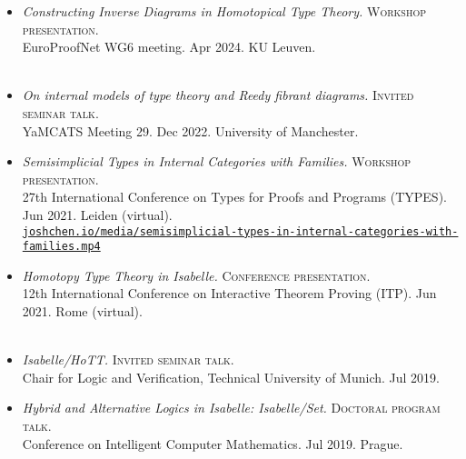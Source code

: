 \documentclass[12pt,a4paper]{article}
\begin{document}
\begin{itemize}
\item
  \emph{Constructing Inverse Diagrams in Homotopical Type Theory.}
  \textsc{Workshop presentation.}\\
  EuroProofNet WG6 meeting.
  Apr 2024.
  KU Leuven.\\
  \\
\item
  \emph{On internal models of type theory and Reedy fibrant diagrams.}
  \textsc{Invited seminar talk.}\\
  YaMCATS Meeting 29.
  Dec 2022.
  University of Manchester.\\
\item
  \emph{Semisimplicial Types in Internal Categories with Families.}
  \textsc{Workshop presentation.}\\
  27th International Conference on Types for Proofs and Programs (TYPES).
  Jun 2021.
  Leiden (virtual).\\
  \vidicon\hspace{0.8ex}\href{https://joshchen.io/media/semisimplicial-types-in-internal-categories-with-families.mp4}{\texttt{joshchen.io/media/semisimplicial-types-in-internal-categories-with-families.mp4}}\\
\item
  \emph{Homotopy Type Theory in Isabelle.}
  \textsc{Conference presentation.}\\
  12th International Conference on Interactive Theorem Proving (ITP).
  Jun 2021.
  Rome (virtual).\\
  \\
\item
  \emph{Isabelle/HoTT.}
  \textsc{Invited seminar talk.}\\
  Chair for Logic and Verification, Technical University of Munich.
  Jul 2019.
\item
\emph{Hybrid and Alternative Logics in Isabelle: Isabelle/Set.}
  \textsc{Doctoral program talk.}\\
  Conference on Intelligent Computer Mathematics.
  Jul 2019.
  Prague.\\
\end{itemize}
\end{document}
